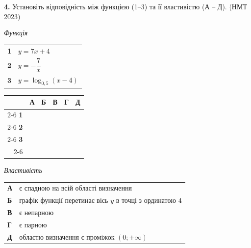 \documentclass[14pt]{extarticle}
\newcommand{\nmtyear}[1]{\hfill{\small\color{yearcolor}(НМТ #1)}}
\begin{document}
\vspace{0.7cm}

\noindent\textbf{4.} Установіть відповідність між функцією (1–3) та її властивістю (А – Д). \nmtyear{2023}

\vspace{0.3cm}

\noindent
\begin{minipage}[t]{0.45\textwidth}
    \textit{Функція} \par \vspace{0.2cm}
    \begin{tabular}{@{}p{0.5cm} p{5cm}@{}}
    \textbf{1} & $y=7x+4$ \\[0.3cm]
    \textbf{2} & $y=-\dfrac{7}{x}$ \\[0.3cm]
    \textbf{3} & $y=\log_{0{,}5}(x-4)$ \\
    \end{tabular}
    
    \vspace{0.5cm}
    
    \begingroup
    \setlength{\tabcolsep}{4pt}
    \renewcommand{\arraystretch}{1.2}
    \small
    \begin{tabular}{r|c|c|c|c|c|}
         \multicolumn{1}{c}{} & \multicolumn{1}{c}{\textbf{А}} & \multicolumn{1}{c}{\textbf{Б}} & \multicolumn{1}{c}{\textbf{В}} & \multicolumn{1}{c}{\textbf{Г}} & \multicolumn{1}{c}{\textbf{Д}} \\ \cline{2-6}
         \textbf{1} & & & & & \\ \cline{2-6}
         \textbf{2} & & & & & \\ \cline{2-6}
         \textbf{3} & & & & & \\ \cline{2-6}
    \end{tabular}
    \endgroup
\end{minipage}%
\hfill
\begin{minipage}[t]{0.50\textwidth}
    \textit{Властивість} \par \vspace{0.2cm}
    \begin{tabular}{@{}p{0.5cm} p{7.5cm}@{}}
    \textbf{А} & є спадною на всій області визначення \\[0.3cm]
    \textbf{Б} & графік функції перетинає вісь $y$ в точці з ординатою $4$ \\[0.3cm]
    \textbf{В} & є непарною \\[0.3cm]
    \textbf{Г} & є парною \\[0.3cm]
    \textbf{Д} & областю визначення є проміжок $(0; +\infty)$ \\
    \end{tabular}
\end{minipage}
\end{document}
